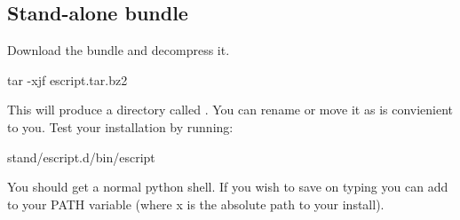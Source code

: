 \subsection{Stand-alone bundle}

Download the bundle and decompress it.
\begin{shellCode}
tar -xjf escript.tar.bz2 
\end{shellCode}
This will produce a directory called . 
You can rename or move it as is convienient to you.
Test your installation by running:
\begin{shellCode}
 stand/escript.d/bin/escript
\end{shellCode}
You should get a normal python shell.
If you wish to save on typing you can add  to your PATH variable (where x is the absolute path to your install). 




